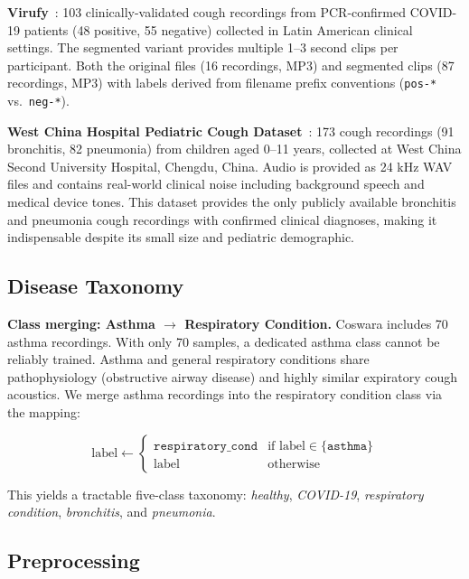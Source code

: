 \documentclass[10pt,journal,compsoc]{IEEEtran}
\begin{document}
\textbf{Virufy}~\cite{virufy}: 103 clinically-validated cough recordings
from PCR-confirmed COVID-19 patients (48 positive, 55 negative) collected
in Latin American clinical settings. The segmented variant provides
multiple 1--3 second clips per participant. Both the original files
(16 recordings, MP3) and segmented clips (87 recordings, MP3) with labels
derived from filename prefix conventions (\texttt{pos-*} vs.\ \texttt{neg-*}).

\textbf{West China Hospital Pediatric Cough Dataset}~\cite{west_china}:
173 cough recordings (91 bronchitis, 82 pneumonia) from children aged
0--11 years, collected at West China Second University Hospital, Chengdu,
China. Audio is provided as 24 kHz WAV files and contains real-world
clinical noise including background speech and medical device tones.
This dataset provides the only publicly available bronchitis and pneumonia
cough recordings with confirmed clinical diagnoses, making it indispensable
despite its small size and pediatric demographic.

\subsection{Disease Taxonomy}

\textbf{Class merging: Asthma $\rightarrow$ Respiratory Condition.}
Coswara includes 70 asthma recordings. With only 70 samples, a dedicated
asthma class cannot be reliably trained. Asthma and general
respiratory conditions share pathophysiology (obstructive airway disease)
and highly similar expiratory cough acoustics. We merge asthma recordings
into the respiratory condition class via the mapping:

\begin{equation}
\text{label} \leftarrow
\begin{cases}
\texttt{respiratory\_cond} & \text{if label} \in \{\texttt{asthma}\} \\
\text{label} & \text{otherwise}
\end{cases}
\label{eq:remap}
\end{equation}

This yields a tractable five-class taxonomy:
\textit{healthy}, \textit{COVID-19}, \textit{respiratory condition},
\textit{bronchitis}, and \textit{pneumonia}.

\subsection{Preprocessing}
\label{sec:preprocessing}
\end{document}

